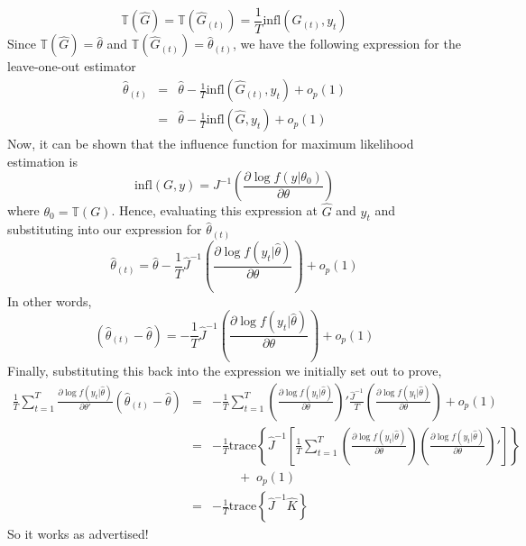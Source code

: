 \documentclass[12pt]{article}
\theoremstyle{definition}
\begin{document}
$$\mathbb{T}(\widehat{G}) = \mathbb{T}(\widehat{G}_{(t)}) = \frac{1}{T} \mbox{infl}\left(\widehat{G}_{(t)}, y_t \right)$$
Since $\mathbb{T}(\widehat{G}) = \widehat{\theta}$ and $\mathbb{T}(\widehat{G}_{(t)}) =\widehat{\theta}_{(t)}$, we have the following expression for the leave-one-out estimator
\begin{eqnarray*}
	\widehat{\theta}_{(t)} &=& \widehat{\theta} - \frac{1}{T} \mbox{infl}\left(\widehat{G}_{(t)}, y_t\right) + o_p(1)\\
	&=& \widehat{\theta} - \frac{1}{T} \mbox{infl}\left(\widehat{G}, y_t\right) + o_p(1)
\end{eqnarray*}
Now, it can be shown that the influence function for maximum likelihood estimation is
	$$\mbox{infl}(G,y) = J^{-1} \left(\frac{\partial \log f(y|\theta_0)}{\partial \theta}\right)$$
where $\theta_0 = \mathbb{T}(G)$. Hence, evaluating this expression at $\widehat{G}$ and $y_t$ and substituting into our expression for $\widehat{\theta}_{(t)}$
	$$\widehat{\theta}_{(t)} = \widehat{\theta} - \frac{1}{T}\widehat{J}^{-1} \left(\frac{\partial \log f(y_t|\widehat{\theta})}{\partial \theta}\right) + o_p(1)$$
In other words,
$$\left(\widehat{\theta}_{(t)} - \widehat{\theta}\right) =  - \frac{1}{T}\widehat{J}^{-1} \left(\frac{\partial \log f(y_t|\widehat{\theta})}{\partial \theta}\right) + o_p(1)$$
Finally, substituting this back into the expression we initially set out to prove,
\begin{eqnarray*}
	\frac{1}{T}\sum_{t=1}^T \frac{\partial \log f(y_t|\widehat{\theta})}{\partial \theta'}\left(\widehat{\theta}_{(t)} - \widehat{\theta} \right) &=& -\frac{1}{T}\sum_{t=1}^T \left(\frac{\partial \log f(y_t|\widehat{\theta})}{\partial \theta}\right)' \frac{\widehat{J}^{-1}}{T}\left(\frac{\partial \log f(y_t|\widehat{\theta})}{\partial \theta}\right) + o_p(1)\\
		&=& -\frac{1}{T}\mbox{trace}\left\{\widehat{J}^{-1}\left[\frac{1}{T}\sum_{t=1}^T \left(\frac{\partial \log f(y_t|\widehat{\theta})}{\partial \theta}\right) \left(\frac{\partial \log f(y_t|\widehat{\theta})}{\partial \theta}\right) '\right]\right\}\\
		&&\quad \quad + \; o_p(1)\\
		&=&-\frac{1}{T}\mbox{trace}\left\{\widehat{J}^{-1} \widehat{K} \right\}
\end{eqnarray*}
So it works as advertised!
\end{document}
